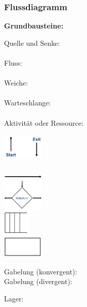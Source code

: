 \subsubsection{Flussdiagramm}
\textbf{Grundbausteine:}
\begin{multicols}{5}
	Quelle und Senke: \\ \\
	Fluss: \\ \\
	Weiche: \\ \\
	Warteschlange: \\ \\
	Aktivität oder Ressource:
\end{multicols}	
\begin{multicols}{5}
	\includegraphics[width=0.15\textwidth]{pictures/fluss_quelle_senke}\\ \\
	\includegraphics[width=0.15\textwidth]{pictures/fluss_fluss}\\
	\includegraphics[width=0.15\textwidth]{pictures/fluss_weiche}\\ 
	\includegraphics[width=0.1\textwidth]{pictures/fluss_warteschlange}\\ 
	\includegraphics[width=0.15\textwidth]{pictures/fluss_aktivitaet}
\end{multicols}
\begin{multicols}{2}
	\begin{multicols}{2}
		Gabelung (konvergent):\\
		Gabelung (divergent):
	\end{multicols}
	Lager:
\end{multicols}
